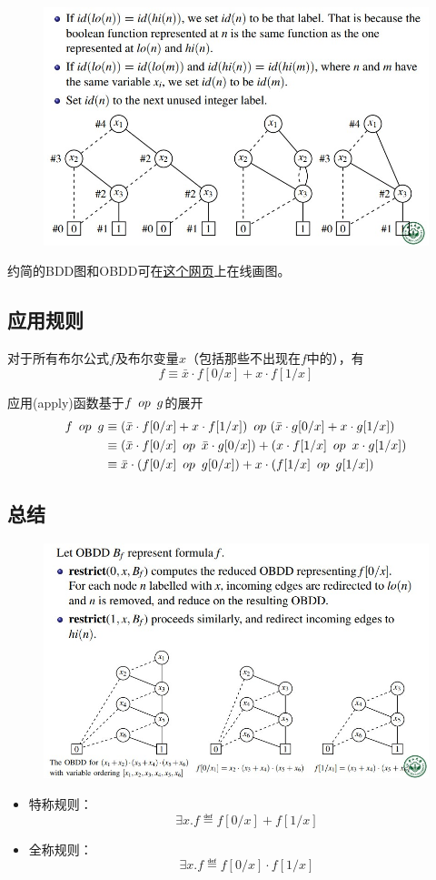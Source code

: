 \begin{figure}[H]
\centering
\includegraphics[width=0.8\linewidth]{fig/reduce_alg.jpg}
\end{figure}

约简的BDD图和OBDD可在\href{http://formal.cs.utah.edu:8080/pbl/BDD.php}{这个网页}上在线画图。

\subsection{应用规则}
\begin{definition}
对于所有布尔公式$f$及布尔变量$x$（包括那些不出现在$f$中的），有
\[f\equiv\bar{x}\cdot f[0/x]+x\cdot f[1/x]\]
\end{definition}
应用(apply)函数基于$f \ \mathop{op}\  g$的展开
\[\begin{aligned}
f \ \mathop{op}\  g &\equiv(\bar{x}\cdot f[0/x]+x\cdot f[1/x])\ \mathop{op}\ (\bar{x}\cdot g[0/x]+x\cdot g[1/x])\\
&\equiv(\bar{x}\cdot f[0/x]\ \mathop{op}\ \bar{x}\cdot g[0/x])+(x\cdot f[1/x]\ \mathop{op}\  x\cdot g[1/x])\\
&\equiv\bar{x}\cdot(f[0/x]\ \mathop{op}\  g[0/x])+x\cdot(f[1/x]\ \mathop{op}\  g[1/x])
\end{aligned}\]

\subsection{总结}
\begin{figure}[H]
\centering
\includegraphics[width=0.8\linewidth]{fig/restrict_alg.jpg}
\end{figure}
\begin{itemize}
\item 特称规则：
\[\exists x.f\eqdef f[0/x]+f[1/x]\]
\item 全称规则：
\[\exists x.f\eqdef f[0/x]\cdot f[1/x]\]
\end{itemize}

